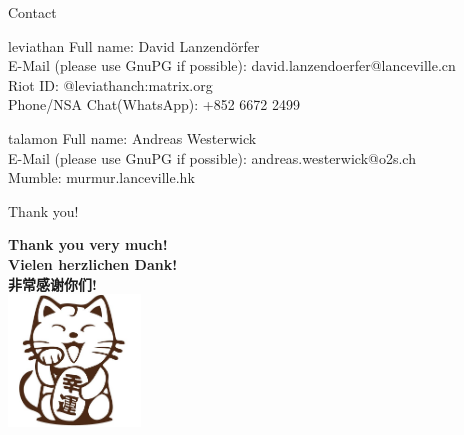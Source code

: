 \documentclass[9pt]{beamer}
\begin{document}
\begin{frame}{Contact}
	\begin{block}{leviathan}
		Full name: David Lanzendörfer \\
		E-Mail (please use GnuPG if possible): david.lanzendoerfer@lanceville.cn \\
		Riot ID: @leviathanch:matrix.org \\
		Phone/NSA Chat(WhatsApp): +852 6672 2499		
	\end{block}
	\begin{block}{talamon}
		Full name: Andreas Westerwick \\
		E-Mail (please use GnuPG if possible): andreas.westerwick@o2s.ch \\
		Mumble: murmur.lanceville.hk
	\end{block}
\end{frame}

\begin{frame}{Thank you!}
	\begin{center}
		\textbf{Thank you very much!} \\
		\textbf{Vielen herzlichen Dank!} \\
		\textbf{\cjkfont 非常感谢你们!} \\
		\includegraphics[width=100pt]{cat.png}
	\end{center}
\end{frame}
\end{document}
